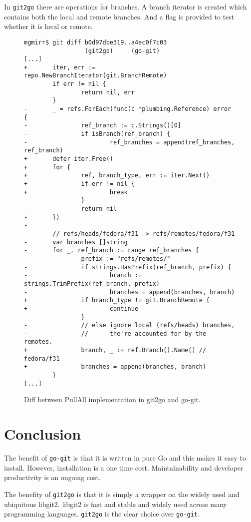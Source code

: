 \documentclass{article}
\begin{document}
In \verb+git2go+ there are operations for branches.
A branch iterator is created which contains both the local and
remote branches.
And a flag is provided to test whether it is local or remote.

\begin{figure}[!ht]
\begin{lstlisting}
mgmirr$ git diff b0d97dbe319..a4ec0f7c03
				 (git2go)     (go-git)
[...]
+       iter, err := repo.NewBranchIterator(git.BranchRemote)
        if err != nil {
                return nil, err
        }
-       _ = refs.ForEach(func(c *plumbing.Reference) error {
-               ref_branch := c.Strings()[0]
-               if isBranch(ref_branch) {
-                       ref_branches = append(ref_branches, ref_branch)
+       defer iter.Free()
+       for {
+               ref, branch_type, err := iter.Next()
+               if err != nil {
+                       break
                }
-               return nil
-       })
-
-       // refs/heads/fedora/f31 -> refs/remotes/fedora/f31
-       var branches []string
-       for _, ref_branch := range ref_branches {
-               prefix := "refs/remotes/"
-               if strings.HasPrefix(ref_branch, prefix) {
-                       branch := strings.TrimPrefix(ref_branch, prefix)
-                       branches = append(branches, branch)
+               if branch_type != git.BranchRemote {
+                       continue
                }
-               // else ignore local (refs/heads) branches,
-               //      the're accounted for by the remotes.
+               branch, _ := ref.Branch().Name() // fedora/f31
+               branches = append(branches, branch)
        }
[...]
\end{lstlisting}
\caption{Diff between PullAll implementation in git2go and go-git.}
\label{fig:pullall-diff}
\end{figure}

\section{Conclusion}

The benefit of \verb+go-git+ is that it is written in pure Go
and this makes it easy to install.
However, installation is a one time cost.
Maintainability and developer productivity is an ongoing cost.

The benefity of \verb+git2go+ is that it is simply a wrapper on
the widely used and ubiquitous libgit2.
libgit2 is fast and stable and widely used across many programming
languages.
\verb+git2go+ is the clear choice over \verb+go-git+.
\end{document}
